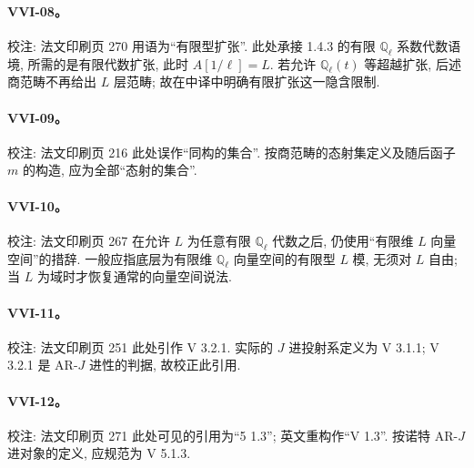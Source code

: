 \hypertarget{collation-VVI-08}{}

\paragraph*{VVI-08。}

校注: 法文印刷页 270 用语为“有限型扩张”. 此处承接 1.4.3 的有限 \(\mathbb Q_\ell\) 系数代数语境, 所需的是有限代数扩张, 此时 \(A[1/\ell]=L\). 若允许 \(\mathbb Q_\ell(t)\) 等超越扩张, 后述商范畴不再给出 \(L\) 层范畴; 故在中译中明确有限扩张这一隐含限制.

\hypertarget{collation-VVI-09}{}

\paragraph*{VVI-09。}

校注: 法文印刷页 216 此处误作“同构的集合”. 按商范畴的态射集定义及随后函子 \(m\) 的构造, 应为全部“态射的集合”.

\hypertarget{collation-VVI-10}{}

\paragraph*{VVI-10。}

校注: 法文印刷页 267 在允许 \(L\) 为任意有限 \(\mathbb Q_\ell\) 代数之后, 仍使用“有限维 \(L\) 向量空间”的措辞. 一般应指底层为有限维 \(\mathbb Q_\ell\) 向量空间的有限型 \(L\) 模, 无须对 \(L\) 自由; 当 \(L\) 为域时才恢复通常的向量空间说法.

\hypertarget{collation-VVI-11}{}

\paragraph*{VVI-11。}

校注: 法文印刷页 251 此处引作 V 3.2.1. 实际的 \(J\) 进投射系定义为 V 3.1.1; V 3.2.1 是 AR-\(J\) 进性的判据, 故校正此引用.

\hypertarget{collation-VVI-12}{}

\paragraph*{VVI-12。}

校注: 法文印刷页 271 此处可见的引用为“5 1.3”; 英文重构作“V 1.3”. 按诺特 AR-\(J\) 进对象的定义, 应规范为 V 5.1.3.

\hypertarget{collation-VIIVIII-01}{}

